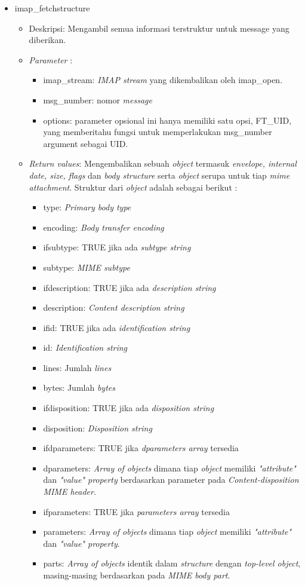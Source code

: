 \begin{itemize}
\item imap\_fetchstructure
\begin{itemize}
\item Deskripsi: Mengambil semua informasi terstruktur untuk message yang diberikan.
\item \textit{Parameter} :
\begin{itemize}
\item imap\_stream: \textit{IMAP stream} yang dikembalikan oleh imap\_open.
\item msg\_number: nomor \textit{message}
\item options: parameter opsional ini hanya memiliki satu opsi, FT\_UID, yang memberitahu fungsi untuk memperlakukan msg\_number argument sebagai UID.
\end{itemize}
\item \textit{Return values}: Mengembalikan sebuah \textit{object} termasuk \textit{envelope, internal date, size, flags} dan \textit{body structure} serta \textit{object} serupa untuk tiap \textit{mime attachment}. Struktur dari \textit{object} adalah sebagai berikut :
 \begin{itemize}
 \item type: \textit{Primary body type}
 \item encoding: \textit{Body transfer encoding}
 \item ifsubtype: TRUE jika ada \textit{subtype string}
 \item subtype: \textit{MIME subtype}
 \item ifdescription: TRUE jika ada \textit{description string}
 \item description: \textit{Content description string}
 \item ifid: TRUE jika ada \textit{identification string}
 \item id: \textit{Identification string}
 \item lines: Jumlah \textit{lines}
 \item bytes: Jumlah \textit{bytes}
 \item ifdisposition: TRUE jika ada \textit{disposition string}
 \item disposition: \textit{Disposition string}
 \item ifdparameters: TRUE jika \textit{dparameters array} tersedia
 \item dparameters: \textit{Array of objects} dimana tiap \textit{object} memiliki \textit{"attribute"} dan \textit{"value" property} berdasarkan parameter pada \textit{Content-disposition MIME header}.
 \item ifparameters: TRUE jika \textit{parameters array} tersedia
 \item parameters: \textit{Array of objects} dimana tiap \textit{object} memiliki \textit{"attribute"} dan \textit{"value" property}.
 \item parts: \textit{Array of objects} identik dalam \textit{structure} dengan \textit{top-level object}, masing-masing berdasarkan pada \textit{MIME body part}.
 \end{itemize}
\end{itemize}


\end{itemize}
